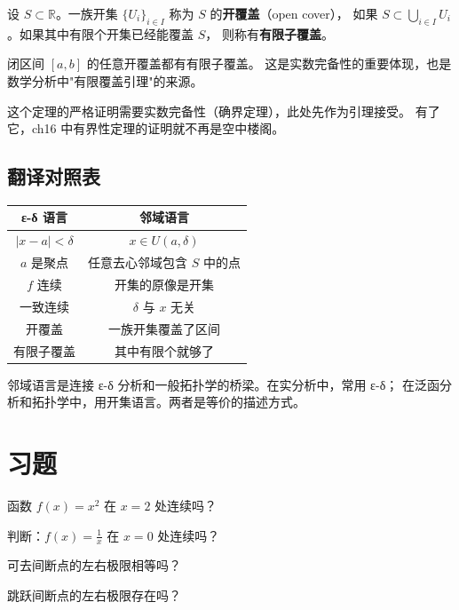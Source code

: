\begin{definitionbox}[开覆盖]
设 \(S\subset\mathbb{R}\)。一族开集 \(\{U_i\}_{i\in I}\) 称为 \(S\) 的\textbf{开覆盖}（open cover），
如果 \(S\subset\bigcup_{i\in I}U_i\)。如果其中有限个开集已经能覆盖 \(S\)，
则称有\textbf{有限子覆盖}。
\end{definitionbox}

\begin{theorembox}[海涅-博雷尔定理]
闭区间 \([a,b]\) 的任意开覆盖都有有限子覆盖。
这是实数完备性的重要体现，也是数学分析中"有限覆盖引理"的来源。
\end{theorembox}

这个定理的严格证明需要实数完备性（确界定理），此处先作为引理接受。
有了它，ch16 中有界性定理的证明就不再是空中楼阁。

\subsection{翻译对照表}

\begin{center}
\begin{tabular}{c|c}
\textbf{ε-δ 语言} & \textbf{邻域语言} \\
\hline
\(|x-a|<\delta\) & \(x\in U(a,\delta)\) \\
\(a\) 是聚点 & 任意去心邻域包含 \(S\) 中的点 \\
\(f\) 连续 & 开集的原像是开集 \\
一致连续 & \(\delta\) 与 \(x\) 无关 \\
开覆盖 & 一族开集覆盖了区间 \\
有限子覆盖 & 其中有限个就够了 \\
\end{tabular}
\end{center}

邻域语言是连接 ε-δ 分析和一般拓扑学的桥梁。在实分析中，常用 ε-δ；
在泛函分析和拓扑学中，用开集语言。两者是等价的描述方式。

\section{习题}

\begin{exercise}[0]
函数 \(f(x)=x^2\) 在 \(x=2\) 处连续吗？
\end{exercise}
\begin{exercise}[0]
判断：\(f(x)=\frac{1}{x}\) 在 \(x=0\) 处连续吗？
\end{exercise}
\begin{exercise}[0]
可去间断点的左右极限相等吗？
\end{exercise}
\begin{exercise}[0]
跳跃间断点的左右极限存在吗？
\end{exercise}

